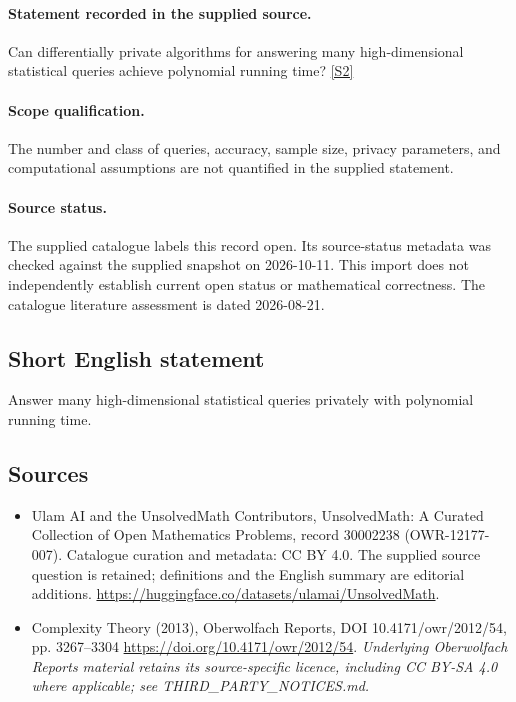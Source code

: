 \documentclass[11pt]{article}
\begin{document}
\paragraph{Statement recorded in the supplied source.}
Can differentially private algorithms for answering many high-dimensional statistical queries achieve polynomial running time? \href{https://doi.org/10.4171/owr/2012/54}{[S2]}
\paragraph{Scope qualification.}
The number and class of queries, accuracy, sample size, privacy parameters, and computational assumptions are not quantified in the supplied statement.
\paragraph{Source status.}
The supplied catalogue labels this record open. Its source-status metadata was checked against the supplied snapshot on 2026-10-11. This import does not independently establish current open status or mathematical correctness. The catalogue literature assessment is dated 2026-08-21.
\subsection{Short English statement}
Answer many high-dimensional statistical queries privately with polynomial running time.
\subsection{Sources}
\begin{itemize}
\item[S1] Ulam AI and the UnsolvedMath Contributors, UnsolvedMath: A Curated Collection of Open Mathematics Problems, record 30002238 (OWR-12177-007). Catalogue curation and metadata: CC BY 4.0. The supplied source question is retained; definitions and the English summary are editorial additions.
\url{https://huggingface.co/datasets/ulamai/UnsolvedMath}.
\item[S2] Complexity Theory (2013), Oberwolfach Reports, DOI 10.4171/owr/2012/54, pp. 3267--3304
\url{https://doi.org/10.4171/owr/2012/54}.
\textit{Underlying Oberwolfach Reports material retains its source-specific licence, including CC BY-SA 4.0 where applicable; see THIRD\_PARTY\_NOTICES.md.}
\end{itemize}
\end{document}
